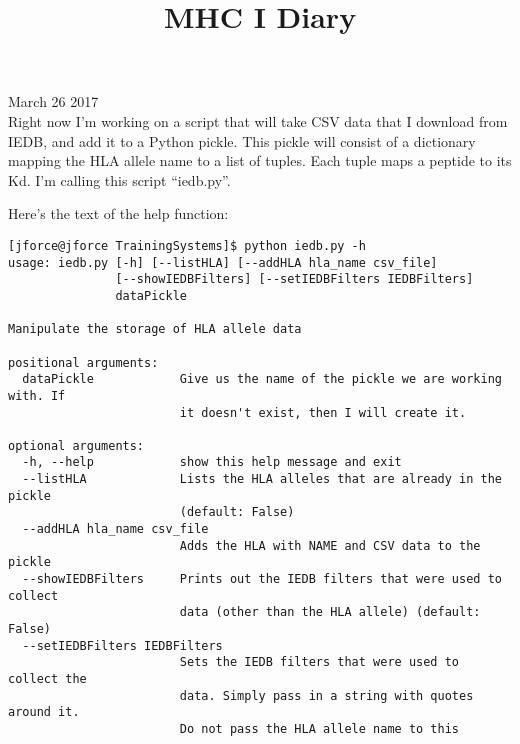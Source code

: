 \documentclass[11pt,letterpaper]{article}
\begin{document}

\title{MHC I Diary}

{\Huge March 26 2017}\\[5mm]

Right now I'm working on a script that will take CSV data that I download from IEDB, and add it to a Python pickle. This pickle will consist of a dictionary mapping the HLA allele name to a list of tuples. Each tuple maps a peptide to its Kd. I'm calling this script ``iedb.py''.


Here's the text of the help function:

\begin{lstlisting}
[jforce@jforce TrainingSystems]$ python iedb.py -h
usage: iedb.py [-h] [--listHLA] [--addHLA hla_name csv_file]
               [--showIEDBFilters] [--setIEDBFilters IEDBFilters]
               dataPickle

Manipulate the storage of HLA allele data

positional arguments:
  dataPickle            Give us the name of the pickle we are working with. If
                        it doesn't exist, then I will create it.

optional arguments:
  -h, --help            show this help message and exit
  --listHLA             Lists the HLA alleles that are already in the pickle
                        (default: False)
  --addHLA hla_name csv_file
                        Adds the HLA with NAME and CSV data to the pickle
  --showIEDBFilters     Prints out the IEDB filters that were used to collect
                        data (other than the HLA allele) (default: False)
  --setIEDBFilters IEDBFilters
                        Sets the IEDB filters that were used to collect the
                        data. Simply pass in a string with quotes around it.
                        Do not pass the HLA allele name to this
\end{lstlisting}


\begin{activityTime}
\end{activityTime}
\end{document}
